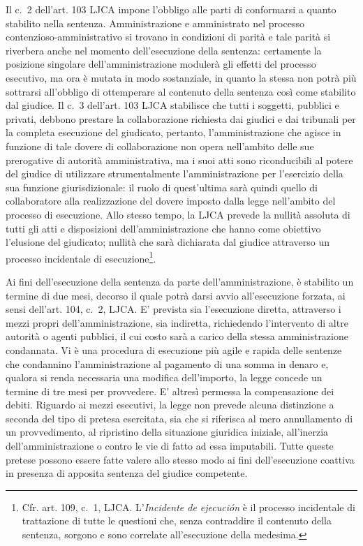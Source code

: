 \documentclass[12pt,it,a4paper,]{report}
\begin{document}
Il c.~2 dell'art. 103 LJCA impone l'obbligo alle parti di conformarsi a
quanto stabilito nella sentenza. Amministrazione e amministrato nel
processo contenzioso-amministrativo si trovano in condizioni di parità e
tale parità si riverbera anche nel momento dell'esecuzione della
sentenza: certamente la posizione singolare dell'amministrazione
modulerà gli effetti del processo esecutivo, ma ora è mutata in modo
sostanziale, in quanto la stessa non potrà più sottrarsi all'obbligo di
ottemperare al contenuto della sentenza così come stabilito dal giudice.
Il c.~3 dell'art. 103 LJCA stabilisce che tutti i soggetti, pubblici e
privati, debbono prestare la collaborazione richiesta dai giudici e dai
tribunali per la completa esecuzione del giudicato, pertanto,
l'amministrazione che agisce in funzione di tale dovere di
collaborazione non opera nell'ambito delle sue prerogative di autorità
amministrativa, ma i suoi atti sono riconducibili al potere del giudice
di utilizzare strumentalmente l'amministrazione per l'esercizio della
sua funzione giurisdizionale: il ruolo di quest'ultima sarà quindi
quello di collaboratore alla realizzazione del dovere imposto dalla
legge nell'ambito del processo di esecuzione. Allo stesso tempo, la LJCA
prevede la nullità assoluta di tutti gli atti e disposizioni
dell'amministrazione che hanno come obiettivo l'elusione del giudicato;
nullità che sarà dichiarata dal giudice attraverso un processo
incidentale di esecuzione\footnote{Cfr. art. 109, c.~1, LJCA.
  L'\emph{Incidente de ejecución} è il processo incidentale di
  trattazione di tutte le questioni che, senza contraddire il contenuto
  della sentenza, sorgono e sono correlate all'esecuzione della
  medesima.}.

Ai fini dell'esecuzione della sentenza da parte dell'amministrazione, è
stabilito un termine di due mesi, decorso il quale potrà darsi avvio
all'esecuzione forzata, ai sensi dell'art. 104, c.~2, LJCA. E' prevista
sia l'esecuzione diretta, attraverso i mezzi propri
dell'amministrazione, sia indiretta, richiedendo l'intervento di altre
autorità o agenti pubblici, il cui costo sarà a carico della stessa
amministrazione condannata. Vi è una procedura di esecuzione più agile e
rapida delle sentenze che condannino l'amministrazione al pagamento di
una somma in denaro e, qualora si renda necessaria una modifica
dell'importo, la legge concede un termine di tre mesi per provvedere. E'
altresì permessa la compensazione dei debiti. Riguardo ai mezzi
esecutivi, la legge non prevede alcuna distinzione a seconda del tipo di
pretesa esercitata, sia che si riferisca al mero annullamento di un
provvedimento, al ripristino della situazione giuridica iniziale,
all'inerzia dell'amministrazione o contro le vie di fatto ad essa
imputabili. Tutte queste pretese possono essere fatte valere allo stesso
modo ai fini dell'esecuzione coattiva in presenza di apposita sentenza
del giudice competente.
\end{document}

